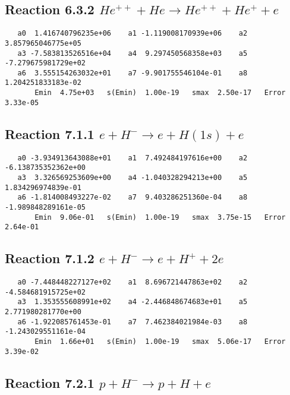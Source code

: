 \documentclass[12pt]{article}
\begin{document}
\newpage
\subsection{
Reaction 6.3.2 $   He^{++} + He \rightarrow He^{++} + He^+ + e$}


\begin{small}\begin{verbatim}
   a0  1.416740796235e+06    a1 -1.119008170939e+06    a2  3.857965046775e+05
   a3 -7.583813526516e+04    a4  9.297450568358e+03    a5 -7.279675981729e+02
   a6  3.555154263032e+01    a7 -9.901755546104e-01    a8  1.204251833183e-02
       Emin  4.75e+03   s(Emin)  1.00e-19   smax  2.50e-17   Error 3.33e-05
\end{verbatim}\end{small}

\newpage
\subsection{
Reaction 7.1.1 $   e + H^- \rightarrow e + H(1s) + e$}


\begin{small}\begin{verbatim}
   a0 -3.934913643088e+01    a1  7.492484197616e+00    a2 -6.138735352362e+00
   a3  3.326569253609e+00    a4 -1.040328294213e+00    a5  1.834296974839e-01
   a6 -1.814008493227e-02    a7  9.403286251360e-04    a8 -1.989848289161e-05
       Emin  9.06e-01   s(Emin)  1.00e-19   smax  3.75e-15   Error  2.64e-01
\end{verbatim}\end{small}

\newpage
\subsection{
Reaction 7.1.2 $   e + H^- \rightarrow e + H^+ + 2e$}


\begin{small}\begin{verbatim}
   a0 -7.448448227127e+02    a1  8.696721447863e+02    a2 -4.584681915725e+02
   a3  1.353555608991e+02    a4 -2.446848674683e+01    a5  2.771980281770e+00
   a6 -1.922085761453e-01    a7  7.462384021984e-03    a8 -1.243029551161e-04
       Emin  1.66e+01   s(Emin)  1.00e-19   smax  5.06e-17   Error  3.39e-02
\end{verbatim}\end{small}

\newpage
\subsection{
Reaction 7.2.1 $   p + H^- \rightarrow p + H + e$}
\end{document}
